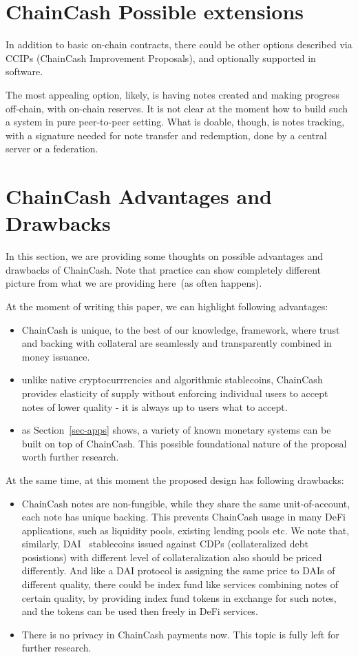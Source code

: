 \documentclass{llncs}   %
\newcommand{\cc}{ChainCash}
\begin{document}
\section{\cc{} Possible extensions}

In addition to basic on-chain contracts, there could be other options described via CCIPs
(ChainCash Improvement Proposals), and optionally supported in software.

The most appealing option, likely, is having notes created and making progress off-chain, with on-chain reserves.
It is not clear at the moment how to build such a system in pure peer-to-peer setting. What is doable, though, is
notes tracking, with a signature needed for note transfer and redemption, done by a central server or a federation.

\section{\cc{} Advantages and Drawbacks}
\label{sec-adv}

In this section, we are providing some thoughts on possible advantages and drawbacks of \cc{}. Note that practice can show
completely different picture from what we are providing here~(as often happens).


At the moment of writing this paper, we can highlight following advantages:
\begin{itemize}
  \item ChainCash is unique, to the best of our knowledge, framework, where trust and backing with collateral are
   seamlessly and transparently combined in money issuance.
  \item unlike native cryptocurrrencies and algorithmic stablecoins, \cc{} provides elasticity of supply without enforcing
  individual users to accept notes of lower quality - it is always up to users what to accept.
  \item as Section~\ref{sec-apps} shows, a variety of known monetary systems can be built on top of \cc{}. This possible
  foundational nature of the proposal worth further research.
\end{itemize}

At the same time, at this moment the proposed design has following drawbacks:
\begin{itemize}
  \item ChainCash notes are non-fungible, while they share the same unit-of-account, each note has unique backing. This prevents ChainCash usage
  in many DeFi applications, such as liquidity pools, existing lending pools etc. We note that, similarly, DAI~\cite{woltzenlogel2023stablecoin} stablecoins issued against CDPs
  (collateralized debt posistions) with different level of collateralization also should be priced differently. And like a DAI protocol is assigning the same price to
  DAIs of different quality, there could be index fund like services combining notes of certain quality, by providing index fund tokens
  in exchange for such notes, and the tokens can be used then freely in DeFi services.
  \item There is no privacy in \cc{} payments now. This topic is fully left for further research.
\end{itemize}


\newpage

 
\end{document}
